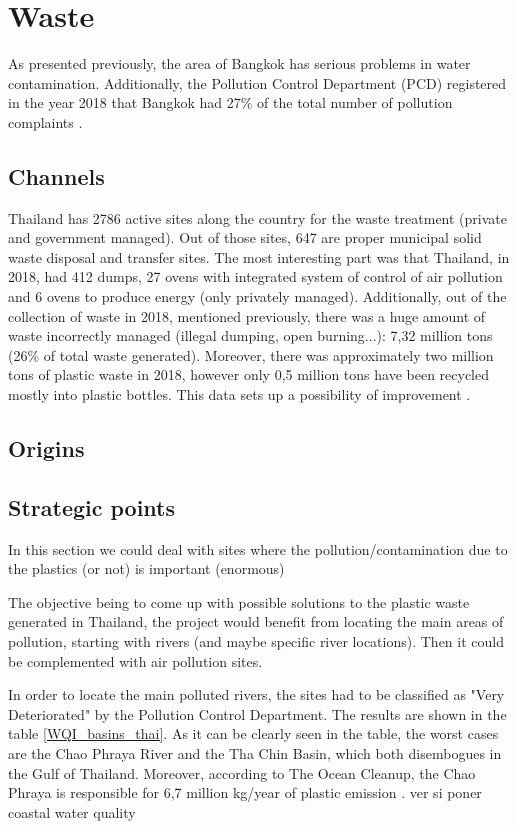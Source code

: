 \documentclass[twoside,a4paper,12pt]{report}
\begin{document}
\section{Waste}
As presented previously, the area of Bangkok has serious problems in water contamination. Additionally, the Pollution Control Department (PCD) registered in the year 2018 that Bangkok had 27\% of the total number of pollution complaints \cite{PolCompl2018}. 

\subsection{Channels}
Thailand has 2786 active sites  along the country for the waste treatment (private and government managed). Out of those sites, 647 are proper municipal solid waste disposal and transfer sites. The most interesting part was that Thailand, in 2018, had 412 dumps, 27 ovens with integrated system of control of air pollution and 6 ovens to produce energy (only privately managed). Additionally, out of the collection of waste in 2018, mentioned previously, there was a huge amount of waste incorrectly managed (illegal dumping, open burning...): 7,32 million tons (26\% of total waste generated). Moreover, there was approximately two million tons of plastic waste in 2018, however only 0,5 million tons have been  recycled mostly into plastic bottles. This data sets up a possibility of improvement \cite{PCD_poll2018}.

\subsection{Origins}
\subsection{Strategic points}
In this section we could deal with sites where the pollution/contamination due to the plastics (or not) is important (enormous)

The objective being to come up with possible solutions to the plastic waste generated in Thailand, the project would benefit from locating the main areas of pollution, starting with rivers (and maybe specific river locations). Then it could be complemented with air pollution sites.

In order to locate the main polluted rivers, the sites had to be classified as "Very Deteriorated" by the Pollution Control Department. The results are shown in the table \ref{WQI_basins_thai}. As it can be clearly seen in the table, the worst cases are the Chao Phraya River  and the Tha Chin Basin, which both disembogues in the Gulf of Thailand. Moreover, according to The Ocean Cleanup, the Chao Phraya is responsible for 6,7 million kg/year of plastic emission \cite{TOC_rivers}.
ver si poner coastal water quality
\end{document}
